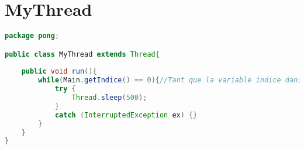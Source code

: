 \section{MyThread}
\begin{lstlisting}[language=Java]
package pong;

public class MyThread extends Thread{
	
	public void run(){
		while(Main.getIndice() == 0){//Tant que la variable indice dans Main vaut 0, le thread existe (celui -ci est modifie dans menu.java)
			try {
				Thread.sleep(500);
			}
			catch (InterruptedException ex) {}
		}
	}
}


\end{lstlisting}